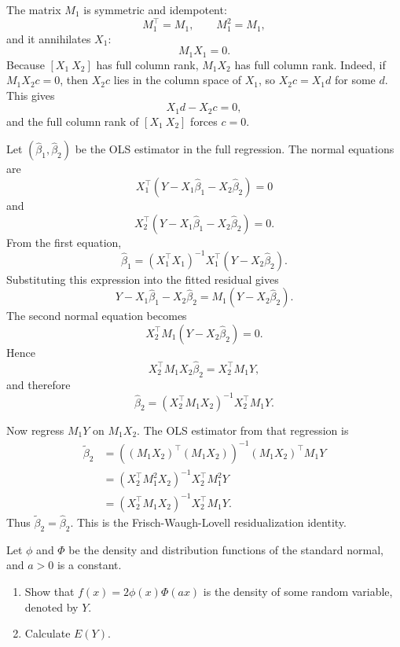\begin{solution}
The matrix $M_1$ is symmetric and idempotent:
\[
M_1^\top=M_1,\qquad M_1^2=M_1,
\]
and it annihilates $X_1$:
\[
M_1X_1=0.
\]
Because $[X_1\ X_2]$ has full column rank, $M_1X_2$ has full column rank. Indeed, if $M_1X_2c=0$, then $X_2c$ lies in the column space of $X_1$, so $X_2c=X_1d$ for some $d$. This gives
\[
X_1d-X_2c=0,
\]
and the full column rank of $[X_1\ X_2]$ forces $c=0$.

Let $(\widehat{\beta}_1,\widehat{\beta}_2)$ be the OLS estimator in the full regression. The normal equations are
\[
X_1^\top(Y-X_1\widehat{\beta}_1-X_2\widehat{\beta}_2)=0
\]
and
\[
X_2^\top(Y-X_1\widehat{\beta}_1-X_2\widehat{\beta}_2)=0.
\]
From the first equation,
\[
\widehat{\beta}_1
={(X_1^\top X_1)}^{-1}X_1^\top(Y-X_2\widehat{\beta}_2).
\]
Substituting this expression into the fitted residual gives
\[
Y-X_1\widehat{\beta}_1-X_2\widehat{\beta}_2
=M_1(Y-X_2\widehat{\beta}_2).
\]
The second normal equation becomes
\[
X_2^\top M_1(Y-X_2\widehat{\beta}_2)=0.
\]
Hence
\[
X_2^\top M_1X_2\widehat{\beta}_2=X_2^\top M_1Y,
\]
and therefore
\[
\widehat{\beta}_2={(X_2^\top M_1X_2)}^{-1}X_2^\top M_1Y.
\]

Now regress $M_1Y$ on $M_1X_2$. The OLS estimator from that regression is
\[
\begin{aligned}
\widetilde{\beta}_2
&={\left({(M_1X_2)}^\top{(M_1X_2)}\right)}^{-1}{(M_1X_2)}^\top M_1Y\\
&={(X_2^\top M_1^2X_2)}^{-1}X_2^\top M_1^2Y\\
&={(X_2^\top M_1X_2)}^{-1}X_2^\top M_1Y.
\end{aligned}
\]
Thus $\widetilde{\beta}_2=\widehat{\beta}_2$. This is the Frisch-Waugh-Lovell residualization identity.
\end{solution}

\begin{exercise}\label{probability:2026:3}
Let $\phi$ and $\Phi$ be the density and distribution functions of the standard normal, and $a>0$ is a constant.
\begin{enumerate}
    \item[(a)] Show that $f(x)=2\phi(x)\Phi(ax)$ is the density of some random variable, denoted by $Y$.
    \item[(b)] Calculate $E(Y)$.
\end{enumerate}
\end{exercise}

